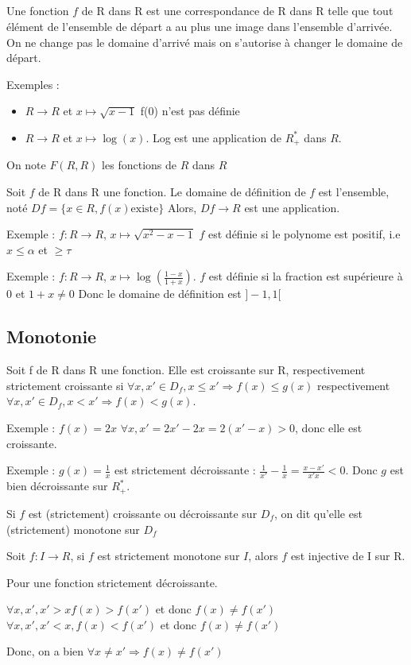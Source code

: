 \documentclass[french]{yLectureNote}
\begin{document}
\subsection{}
Une fonction $f$ de R dans R est une correspondance de R dans R telle que tout élément de l'ensemble de départ a au plus une image dans l'ensemble d'arrivée. On ne change pas le domaine d'arrivé mais on s'autorise à changer le domaine de départ.

Exemples :
\begin{itemize}
 \item $R\rightarrow R$ et $x\longmapsto \sqrt{x-1}$ f(0) n'est pas définie
 \item $R\rightarrow R$ et $x\longmapsto \log(x)$. Log est une application de $R_+^*$ dans $R$.
\end{itemize}

On note $F(R,R)$ les fonctions de $R$ dans $R$

\begin{theorem}
Soit $f$ de R dans R une fonction. Le domaine de définition de $f$ est l'ensemble, noté $Df = \{x\in R, f(x) \text{existe}\}$ Alors, $Df\rightarrow R$ est une application.
\end{theorem}

Exemple : $f : R \rightarrow R$, $x\longmapsto \sqrt{x^2-x-1}$ $f$ est définie si le polynome est positif, i.e $x\leq\alpha$ et $\geq\tau$

Exemple : $f : R \rightarrow R$, $x\longmapsto \log(\frac{1-x}{1+x})$. $f$ est définie si la fraction est supérieure à 0 et $1+x\neq 0$ Donc le domaine de définition est $]-1,1[$
\subsection{Monotonie}
Soit f de R dans R une fonction. Elle est croissante sur R, respectivement strictement croissante si $\forall x,x'\in D_f, x\leq x' \Rightarrow f(x)\leq g(x)$ respectivement $\forall x,x'\in D_f, x<x' \Rightarrow f(x)< g(x)$.

Exemple : $f(x) = 2x$ $\forall x,x' = 2x'-2x = 2(x'-x) >0$, donc elle est croissante.

Exemple : $g(x) = \frac{1}{x}$ est strictement décroissante : $\frac{1}{x'} - \frac{1}{x} = \frac{x-x'}{x'x} <0$. Donc $g$ est bien décroissante sur $R_+^*$.

Si $f$ est (strictement) croissante ou décroissante sur $D_f$, on dit qu'elle est (strictement) monotone sur $D_f$
\begin{theorem}[Proposition]
Soit $f : I\rightarrow R$, si $f$ est strictement monotone sur $I$, alors $f$ est injective de I sur R.
\end{theorem}
\begin{myproof}
Pour une fonction strictement décroissante.

$\forall x,x', x'>x f(x)>f(x')$ et donc $f(x)\neq f(x')$
$\forall x,x',x'<x, f(x)<f(x')$ et donc $f(x)\neq f(x')$

Donc, on a bien $\forall x\neq x' \Rightarrow f(x)\neq f(x')$
\end{myproof}
\end{document}
